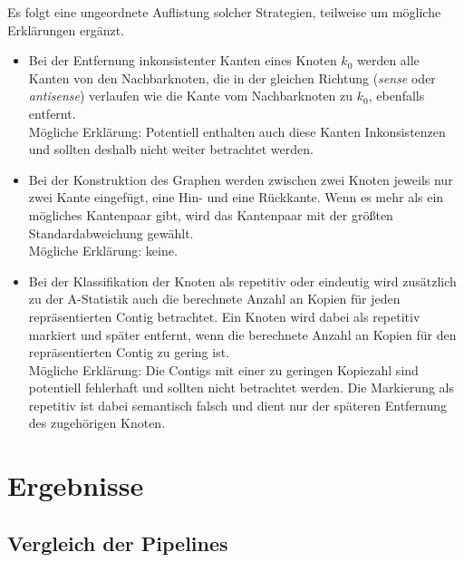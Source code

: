 \documentclass[a4paper,10pt,parskip]{scrartcl}
\begin{document}
Es folgt eine ungeordnete Auflistung solcher Strategien, teilweise um
mögliche Erklärungen ergänzt.
\begin{itemize}
\item Bei der Entfernung inkonsistenter Kanten eines Knoten $k_0$
  werden alle Kanten von den Nachbarknoten, die in der gleichen
  Richtung (\textit{sense} oder \textit{antisense}) verlaufen wie die
  Kante vom Nachbarknoten zu $k_0$, ebenfalls entfernt. \\
  Mögliche Erklärung: Potentiell enthalten auch diese Kanten
  Inkonsistenzen und sollten deshalb nicht weiter betrachtet werden.
\item Bei der Konstruktion des Graphen werden zwischen zwei Knoten
  jeweils nur zwei Kante eingefügt, eine Hin- und eine Rückkante.
  Wenn es mehr als ein mögliches Kantenpaar gibt, wird das Kantenpaar mit der
  größten Standardabweichung gewählt. \\
  Mögliche Erklärung: keine.
\item Bei der Klassifikation der Knoten als repetitiv oder eindeutig
  wird zusätzlich zu der A-Statistik auch die berechnete Anzahl an
  Kopien für jeden repräsentierten Contig betrachtet. Ein Knoten wird
  dabei als repetitiv markiert und später entfernt, wenn die
  berechnete Anzahl an Kopien für den repräsentierten Contig zu gering
  ist. \\
  Mögliche Erklärung: Die Contigs mit einer zu geringen
  Kopiezahl sind potentiell fehlerhaft und sollten nicht betrachtet
  werden. Die Markierung als repetitiv ist dabei semantisch falsch und
  dient nur der späteren Entfernung des zugehörigen Knoten.
\end{itemize}

\section{Ergebnisse}
\label{sec: Ergebnisse}
\subsection{Vergleich der Pipelines }
\end{document}
